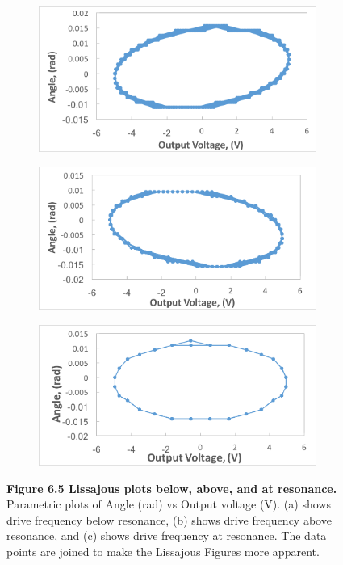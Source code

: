 \documentclass[11pt]{report}
\begin{document}
\begin{figure}
    \begin{subfigure}{.5\textwidth}
        \centering
        \includegraphics[width=0.95\linewidth]{LissajousLeft.png}
        \caption{}
    \end{subfigure}
    \begin{subfigure}{.5\textwidth}
        \centering
        \includegraphics[width=0.95\linewidth]{LissajousRight.png}
        \caption{}
    \end{subfigure}
    \begin{subfigure}{\textwidth}
        \centering
        \includegraphics[width=\linewidth]{LissajousCenter.png}
        \caption{}
    \end{subfigure}
    \captionsetup{labelformat=empty}
    \caption{\textbf{Figure 6.5 Lissajous plots below, above, and at resonance.}
        Parametric plots of Angle (rad) vs Output voltage (V). (a) shows drive
    frequency below resonance, (b) shows drive frequency above resonance, and (c)
shows drive frequency at resonance. The data points are joined to make the
Lissajous Figures more apparent.}
\end{figure}
\end{document}
